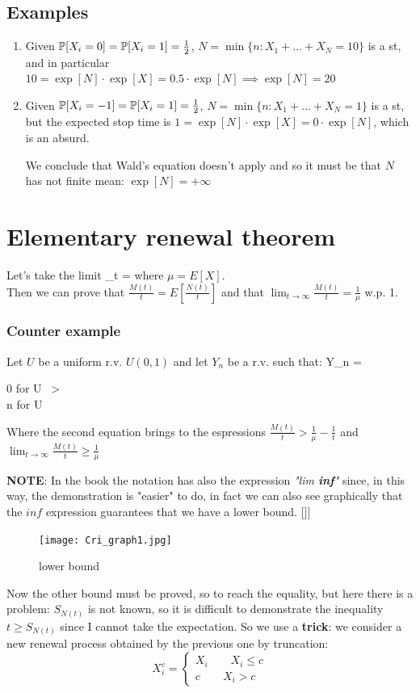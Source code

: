 \subsection{Examples}
	\begin{enumerate}
		\item Given $\mathbb{P}[X_i=0]=\mathbb{P}[X_i = 1] = \frac{1}{2}$, $N = \min\{n : X_1 + \dots + X_N =10\}$ is a \gls{st}, and in particular
		$10 = \exp[N] \cdot \exp[X] = 0.5 \cdot \exp[N] \implies \exp[N]=20$
		\item Given $\mathbb{P}[X_i=-1]=\mathbb{P}[X_i = 1] = \frac{1}{2}$, $N = \min\{n : X_1 + \dots + X_N =1\}$ is a \gls{st}, but the expected stop time
		is $1 = \exp[N] \cdot \exp[X] = 0 \cdot \exp[N] $, which is an absurd.

		We conclude that Wald's equation doesn't apply and so it must be that $N$ has not finite mean: $\exp[N]=+\infty$
	\end{enumerate}

	\section{Elementary renewal theorem}
	Let's take the limit
	\beq
	\lim_{t \to \infty} = 
	\eeq
	where $\mu = E[X]$.\\
	Then we can prove that $\frac{M(t)}{t} = E[\frac{N(t)}{t}]$ and that $\lim_{t \to \infty}\frac{M(t)}{t} = \frac{1}{\mu}$ w.p. 1.
	\subsubsection{Counter example}
	Let $U$ be a uniform r.v. $U(0,1)$ and let $Y_n$ be a r.v. such that:
	\beq
	Y_n =
	\begin{cases}
	0 \quad for \quad U \ > \\
	n \quad for \quad U \leq {}
	\end{cases}
	\eeq
	Where the second equation brings to the espressions $\frac{M(t)}{t} > \frac{1}{\mu} - \frac{1}{t}$ and $\lim_{t \to \infty} \frac{M(t)}{t} \geq \frac{1}{\mu}$

	\textbf{NOTE}: In the book the notation has also the expression \textit{"lim \textbf{inf}"} since, in this way, the demonstration is "easier" to do, in fact we can also see graphically that the $inf$ expression guarantees that we have a lower bound. []\Fig{fig:graph1}]
	\begin{figure}[h]
	\centering
	\texttt{[image: Cri\_graph1.jpg]}
	\caption{lower bound}
	\label{fig:graph1}
	\end{figure}
	Now the other bound must be proved, so to reach the equality, but here there is a problem: $S_{N(t)}$ is not known, so it is difficult to demonstrate the inequality $t \geq S_{N(t)}$ since I cannot take the expectation. So we use a \textbf{trick}: we consider a new renewal process obtained by the previous one by truncation:
	\begin{equation}
	X_i^c =
	\begin{cases}
	X_i \qquad X_i \leq c\\
	c \qquad X_i >c
	\end{cases}
	\end{equation}

